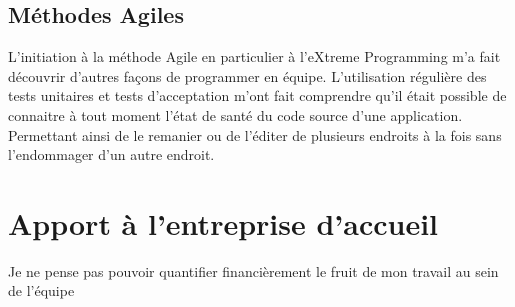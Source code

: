 \subsection{Méthodes Agiles}
L'initiation à la méthode Agile en particulier à l'eXtreme Programming m'a fait découvrir d'autres façons de programmer en équipe. L'utilisation régulière des tests unitaires et tests d'acceptation m'ont fait comprendre qu'il était possible de connaitre à tout moment l'état de santé du code source d'une application. Permettant ainsi de le remanier ou de l'éditer de plusieurs endroits à la fois sans l'endommager d'un autre endroit.


\section{Apport à l'entreprise d'accueil}
Je ne pense pas pouvoir quantifier financièrement le fruit de mon travail au sein de l'équipe